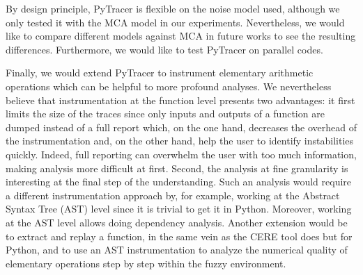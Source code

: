 \documentclass[11pt]{article}
\newcommand{\pytracer}[0]{PyTracer\xspace}
\begin{document}
By design principle, \pytracer is flexible on the noise model used, although we only tested it with the MCA model in our experiments. Nevertheless, we would like to compare different models against MCA in future works to see the resulting differences. Furthermore, we would like to test \pytracer on parallel codes.

Finally, we would extend \pytracer to instrument elementary arithmetic operations which can be helpful to more profound analyses. We nevertheless believe that instrumentation at the function level presents two advantages: it first limits the size of the traces since only inputs and outputs of a function are dumped instead of a full report which, on the one hand, decreases the overhead of the instrumentation and, on the other hand, help the user to identify instabilities quickly. Indeed, full reporting can overwhelm the user with too much information, making analysis more difficult at first. Second, the analysis at fine granularity is interesting at the final step of the understanding. Such an analysis would require a different instrumentation approach by, for example, working at the Abstract Syntax Tree (AST) level since it is trivial to get it in Python.
Moreover, working at the AST level allows doing dependency analysis. Another extension would be to extract and replay a function, in the same vein as the CERE tool does but for Python, and to use an AST instrumentation to analyze the numerical quality of elementary operations step by step within the fuzzy environment.




\end{document}
